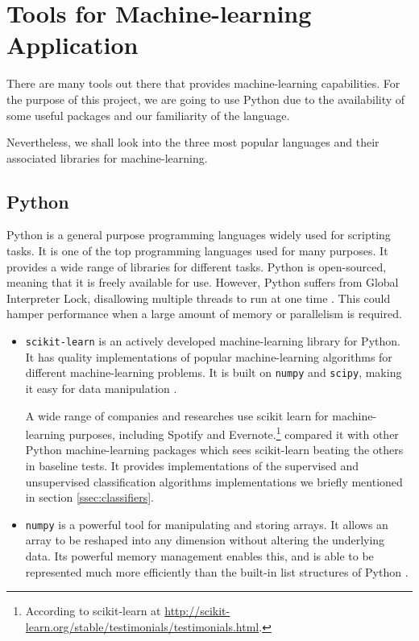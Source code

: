 \newpage
\section{Tools for Machine-learning Application} \label{sec:lit-tools}
There are many tools out there that provides machine-learning capabilities. For the purpose of this project, we are going to use Python due to the availability of some useful packages and our familiarity of the language. 

Nevertheless, we shall look into the three most popular languages and their associated libraries for machine-learning. 

\subsection{Python}
Python is a general purpose programming languages widely used for scripting tasks. It is one of the top programming languages used for many purposes. It provides a wide range of libraries for different tasks. Python is open-sourced, meaning that it is freely available for use. However, Python suffers from Global Interpreter Lock, disallowing multiple threads to run at one time \cite{gil}. This could hamper performance when a large amount of memory or parallelism is required.

\begin{itemize}
  \item \texttt{scikit-learn} is an actively developed machine-learning library for Python. It has quality implementations of popular machine-learning algorithms for different machine-learning problems. It is built on \texttt{numpy} and \texttt{scipy}, making it easy for data manipulation \cite{scikit-learn-paper}. 
    
A wide range of companies and researches use scikit learn for machine-learning purposes, including Spotify and Evernote.\footnote{According to scikit-learn at \url{http://scikit-learn.org/stable/testimonials/testimonials.html}.}  compared it with other Python machine-learning packages which sees scikit-learn beating the others in baseline tests. It provides implementations of the supervised and unsupervised classification algorithms implementations we briefly mentioned in section \ref{ssec:classifiers}.

  \item \texttt{numpy} is a powerful tool for manipulating and storing arrays. It allows an array to be reshaped into any dimension without altering the underlying data. Its powerful memory management enables this, and is able to be represented much more efficiently than the built-in list structures of Python \cite{numpy}.
\end{itemize}


